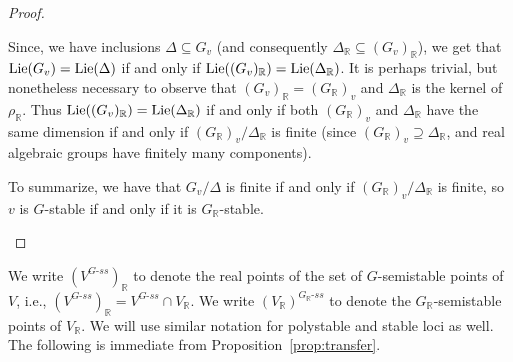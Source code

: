 \documentclass[11pt]{amsart}
\newcommand{\Vnote}[1]{\begin{quote}{\color{red}{{\sf Visu's Note:} {\sl{#1}}}} \end{quote}}
\theoremstyle{definition}
\newcommand{\R}{{\mathbb R}}
\newcommand{\Lie} {{\rm Lie}}
\newcommand{\GL}{\operatorname{GL}}
\begin{document}
\begin{proof}
\begin{itemize}


Since, we have inclusions $\Delta \subseteq G_v$ (and consequently $\Delta_\R \subseteq (G_v)_\R$), we get that $\Lie(G_v) = \Lie(\Delta)$ if and only if $\Lie((G_v)_\R) = \Lie(\Delta_\R)$. It is perhaps trivial, but nonetheless necessary to observe that $(G_v)_\R = (G_\R)_v$ and $\Delta_\R$ is the kernel of $\rho_\R$.  Thus $\Lie((G_v)_\R) = \Lie(\Delta_\R)$ if and only if both $(G_\R)_v$ and $\Delta_\R$ have the same dimension if and only if $(G_\R)_v/\Delta_\R$ is finite (since $(G_\R)_v \supseteq \Delta_\R$, and real algebraic groups have finitely many components).

To summarize, we have that $G_v/\Delta$ is finite if and only if $(G_\R)_v/\Delta_\R$ is finite, so $v$ is $G$-stable if and only if it is $G_\R$-stable.



\end{itemize}
\end{proof}


We write $(V^{G\text{-}ss})_\R$ to denote the real points of the set of $G$-semistable points of $V$, i.e., $(V^{G\text{-}ss})_\R = V^{G\text{-}ss} \cap V_\R$. We write $(V_\R)^{G_\R\text{-}ss}$ to denote the $G_\R$-semistable points of $V_\R$. We will use similar notation for polystable and stable loci as well. The following is immediate from Proposition~\ref{prop:transfer}.
\end{document}
